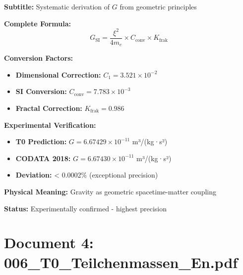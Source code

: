 	\begin{documentbox}
		\textbf{Subtitle:} Systematic derivation of $G$ from geometric principles
		
		\textbf{Complete Formula:}
		\begin{equation}
			\boxed{G_{\text{SI}} = \frac{\xi^2}{4 m_e} \times C_{\text{conv}} \times K_{\text{frak}}}
		\end{equation}
		
		\textbf{Conversion Factors:}
		\begin{itemize}
			\item \textbf{Dimensional Correction:} $C_1 = 3.521 \times 10^{-2}$ 
			\item \textbf{SI Conversion:} $C_{\text{conv}} = 7.783 \times 10^{-3}$
			\item \textbf{Fractal Correction:} $K_{\text{frak}} = 0.986$
		\end{itemize}
		
		\textbf{Experimental Verification:}
		\begin{itemize}
			\item \textbf{T0 Prediction:} $G = 6.67429 \times 10^{-11}$ m³/(kg·s²)
			\item \textbf{CODATA 2018:} $G = 6.67430 \times 10^{-11}$ m³/(kg·s²)
			\item \textbf{Deviation:} < 0.0002\% (exceptional precision)
		\end{itemize}
		
		\textbf{Physical Meaning:} Gravity as geometric spacetime-matter coupling
		
		\textbf{Status:} Experimentally confirmed - highest precision
	\end{documentbox}
	
	\section{Document 4: 006\_T0\_Teilchenmassen\_En.pdf}
	
